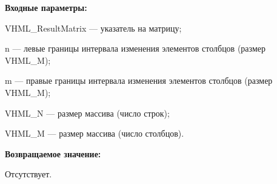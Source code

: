 \textbf{Входные параметры:}
 
VHML\_ResultMatrix --- указатель на матрицу;
 
n --- левые границы интервала изменения элементов столбцов (размер VHML\_M);
 
m --- правые границы интервала изменения элементов столбцов (размер VHML\_M);
 
VHML\_N --- размер массива (число строк);
 
VHML\_M --- размер массива (число столбцов).

\textbf{Возвращаемое значение:}

Отсутствует.